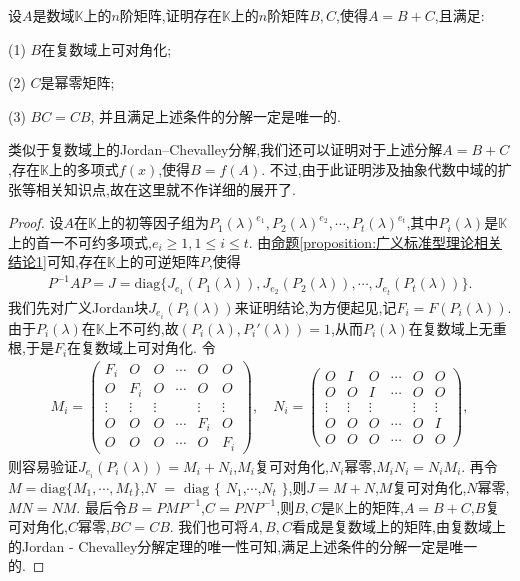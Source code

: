 \documentclass[../../main.tex]{subfiles}
\begin{document}
\begin{theorem}\label{theorem:数K上的Jordan-Chevalley分解}
设$A$是数域$\mathbb{K}$上的$n$阶矩阵,证明存在$\mathbb{K}$上的$n$阶矩阵$B,C$,使得$A = B + C$,且满足:

(1) $B$在复数域上可对角化; 

(2) $C$是幂零矩阵; 

(3) $BC = CB$,
并且满足上述条件的分解一定是唯一的.
\end{theorem}
\begin{remark}
类似于复数域上的Jordan--Chevalley分解,我们还可以证明对于上述分解$A = B + C$,存在$\mathbb{K}$上的多项式$f(x)$,使得$B = f(A)$. 不过,由于此证明涉及抽象代数中域的扩张等相关知识点,故在这里就不作详细的展开了. 
\end{remark}
\begin{proof}
设$A$在$\mathbb{K}$上的初等因子组为$P_1(\lambda)^{e_1},P_2(\lambda)^{e_2},\cdots,P_t(\lambda)^{e_t}$,其中$P_i(\lambda)$是$\mathbb{K}$上的首一不可约多项式,$e_i\geqslant 1, 1\leqslant i\leqslant t$. 由\hyperref[proposition:广义标准型理论相关结论1]{命题\ref{proposition:广义标准型理论相关结论1}}可知,存在$\mathbb{K}$上的可逆矩阵$P$,使得
\begin{align*}
P^{-1}AP = J=\mathrm{diag}\{J_{e_1}(P_1(\lambda)),J_{e_2}(P_2(\lambda)),\cdots,J_{e_t}(P_t(\lambda))\}.
\end{align*}
我们先对广义Jordan块$J_{e_i}(P_i(\lambda))$来证明结论,为方便起见,记$F_i = F(P_i(\lambda))$. 由于$P_i(\lambda)$在$\mathbb{K}$上不可约,故$(P_i(\lambda),P_i'(\lambda)) = 1$,从而$P_i(\lambda)$在复数域上无重根,于是$F_i$在复数域上可对角化. 令
\begin{align*}
M_i = 
\begin{pmatrix}
F_i & O & O & \cdots & O & O \\
O & F_i & O & \cdots & O & O \\
\vdots & \vdots & \vdots & & \vdots & \vdots \\
O & O & O & \cdots & F_i & O \\
O & O & O & \cdots & O & F_i
\end{pmatrix}, \quad 
N_i = 
\begin{pmatrix}
O & I & O & \cdots & O & O \\
O & O & I & \cdots & O & O \\
\vdots & \vdots & \vdots & & \vdots & \vdots \\
O & O & O & \cdots & O & I \\
O & O & O & \cdots & O & O
\end{pmatrix},
\end{align*}
则容易验证$J_{e_i}(P_i(\lambda)) = M_i + N_i$,$M_i$复可对角化,$N_i$幂零,$M_iN_i = N_iM_i$. 再令$M = \mathrm{diag}\{M_1,\cdots,M_t\}$,$N $ $=$ $\mathrm{diag}$ $\{$ $N_1$,$\cdots$,$N_t$ $\}$,则$J = M + N$,$M$复可对角化,$N$幂零,$MN = NM$. 最后令$B = PMP^{-1}$,$C = PNP^{-1}$,则$B,C$是$\mathbb{K}$上的矩阵,$A = B + C$,$B$复可对角化,$C$幂零,$BC = CB$. 我们也可将$A,B,C$看成是复数域上的矩阵,由复数域上的Jordan - Chevalley分解定理的唯一性可知,满足上述条件的分解一定是唯一的. 
\end{proof}
\end{document}
